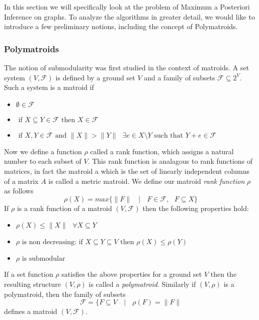 In this section we will specifically look at the problem of Maximum a Posteriori Inference on graphs. To analyze the algorithms in greater detail, we would like to introduce a few preliminary notions, including the concept of Polymatroids. 
\subsubsection{Polymatroids}
The notion of submodularity was first studied in the context of matroids. A set system $(V,\mathcal{F})$ is defined by a ground set $V$ and a family of subsets $\mathcal{F} \subseteq 2^V$. Such a system is a matroid if
\begin{itemize}

\item $\emptyset \in \mathcal{F}$
\item $\text{ if } X \subseteq Y \in \mathcal{F} \text{ then } X\in \mathcal{F}$
\item $\text{ if } X,Y \in \mathcal{F} \text{ and } \|X\| > \|Y\| \text{ } \exists e\in X\setminus Y \text{ such that } Y+e\in\mathcal{F}$
\end{itemize}

Now we define a function $\rho$ called a rank function, which assigns a natural number to each subset of $V$. This rank function is analagous to rank functions of matrices, in fact the matroid a which is the set of linearly independent columns of a matrix $A$ is called a metric matroid. We define our matroid {\it rank function} $\rho$ as follows
\[
\rho(X) = max\{\|F\| \text{ }\mid \text{ } F\in\mathcal{F}, \text{ }F\subseteq X\}
\]
If $\rho$ is a rank function of a matroid $(V,\mathcal{F})$ then the following properties hold:
\begin{itemize}
\item $\rho(X) \leq \|X\| \text{ }\forall X\subseteq Y$
\item $\rho \text{ is non decreasing: if } X \subseteq Y \subseteq V \text{ then } \rho(X) \leq \rho(Y)$
\item $\rho \text{ is submodular }$
\end{itemize}

If a set function $\rho$ satisfies the above properties for a ground set $V$ then the resulting structure $(V,\rho)$ is called a {\it polymatroid}. Similarly if $(V,\rho)$ is a polymatroid, then the family of subsets
\[
\mathcal{F} = \{ F\subseteq V \text{ }\mid \text{ } \rho(F) = \|F\|
\]
defines a matroid $(V,\mathcal{F})$.

